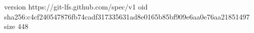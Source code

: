 version https://git-lfs.github.com/spec/v1
oid sha256:c4cf240547876fb74cadf317335631ad8e0165b85bf909e6aa0e76aa21851497
size 448

